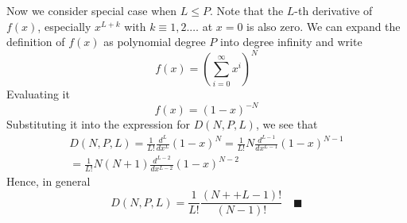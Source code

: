 \documentclass[../../main.tex]{subfiles}
\begin{document}
Now we consider special case when $L\leq P$. Note that the $L$-th derivative of $f(x) $, especially $x^{L+k}$ with $k\equiv 1,2.\dots$ at $x=0$ is also zero. We can expand the definition of $f(x)$ as polynomial degree $P$ into degree infinity and write
\begin{equation*}
    f(x)=\left(\sum^{\infty}_{i=0}x^i\right)^N
\end{equation*}
Evaluating it
\begin{equation*}
    f(x)=(1-x)^{-N}
\end{equation*}
Substituting it into the expression for $D(N,P,L)$, we see that 
\begin{multline*}
    D(N,P,L)=\frac{1}{L!}\frac{d^L}{dx^L}(1-x)^N =\frac{1}{L!}N\frac{d^{L-1}}{dx^{L-1}}(1-x)^{N-1}\\ =\frac{1}{L!} N(N+1) \frac{d^{L-2}}{dx^{L-2}}(1-x)^{N-2}
\end{multline*}
Hence, in general
\begin{equation*}
    D(N,P,L)=\frac{1}{L!}\frac{(N++L-1)!}{(N-1)!}\quad \blacksquare
\end{equation*}
\end{document}

